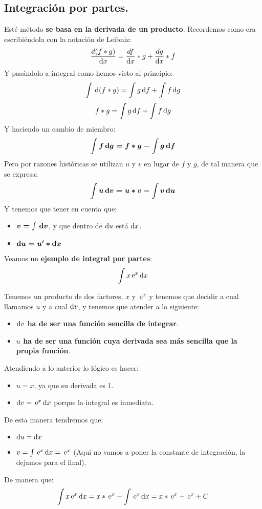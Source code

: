 \documentclass[a4paper,11pt,answers]{exam}
\begin{document}
\subsection{Integración por partes.}
Esté método \textbf{se basa en la derivada de un producto}. Recordemos como era escribiéndola con la notación de Leibniz:
\[\frac{d(f*g)}{\mathrm{d}x} = \frac{df}{\mathrm{d}x}*g + \frac{dg}{\mathrm{d}x} *f\]
Y pasándolo a integral como hemos visto al principio:
\[\int \,\mathrm{d}(f*g) = \int g\,\mathrm{d}f + \int f\,\mathrm{d}g\]
\[f*g = \int g\,\mathrm{d}f + \int f\,\mathrm{d}g\]
Y haciendo un cambio de miembro:
\[\boldsymbol{\int f\,\mathrm{d}g = f*g - \int g\,\mathrm{d}f}\]
Pero por razones históricas se utilizan $u$ y $v$ en lugar de $f$ y $g$, de tal manera que se expresa:
\[\boldsymbol{\int u\,\mathrm{d}v = u*v - \int v\,\mathrm{d}u}\]
Y tenemos que tener en cuenta que:
\begin{itemize}
	\item $\boldsymbol{v = \int \,\mathrm{d}v}$, y que dentro de $\mathrm{d}u$ está $\mathrm{d}x$.
	\item $\boldsymbol{\mathrm{d}u = u'*\mathrm{d}x}$
	
\end{itemize}
Veamos un \textbf{ejemplo de integral por partes}:
\[\int x\,\mathrm{e}^x\,\mathrm{d}x\]
\begin{solution}
Tenemos un producto de dos factores, $x$ y $\,\mathrm{e}^x$ y tenemos que decidir a cual llamamos $u$ y a cual $\mathrm{d}v$, y tenemos que atender a lo siguiente:
\begin{itemize}
	\item \textbf{$\mathrm{d}v$ ha de ser una función sencilla de integrar}.
	\item \textbf{$u$ ha de ser una función cuya derivada sea más sencilla que la propia función}.
\end{itemize}
Atendiendo a lo anterior lo lógico es hacer:
\begin{itemize}
	\item $u = x$, ya que su derivada es 1.
	\item $\mathrm{d}v = \,\mathrm{e}^x\, \mathrm{d}x$ porque la integral es inmediata.
\end{itemize}
De esta manera tendremos que:
\begin{itemize}
	\item $\mathrm{d}u = \mathrm{d}x$
	\item $v = \int \,\mathrm{e}^x\,\mathrm{d}x = \,\mathrm{e}^x$ (Aquí no vamos a poner la constante de integración, la dejamos para el final).
\end{itemize}
De manera que:
\[\int x\,\mathrm{e}^x\,\mathrm{d}x = x*\,\mathrm{e}^x - \int \,\mathrm{e}^x\,\mathrm{d}x = x*\,\mathrm{e}^x - \,\mathrm{e}^x +C\]
\end{solution}
\end{document}
